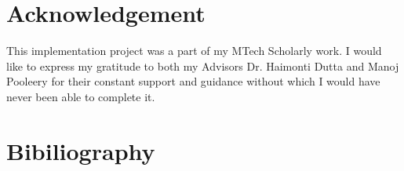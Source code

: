 \documentclass[amsart, 12pt]{article}
\begin{document}
\section{Acknowledgement}
This implementation project was a part of my MTech Scholarly work. I would like to express my gratitude to both my Advisors Dr. Haimonti Dutta and Manoj Pooleery for their constant support and guidance without which I would have never been able to complete it.

\nocite{cdnc,digital,eval,noisy}

\section{Bibiliography}


\end{document}
